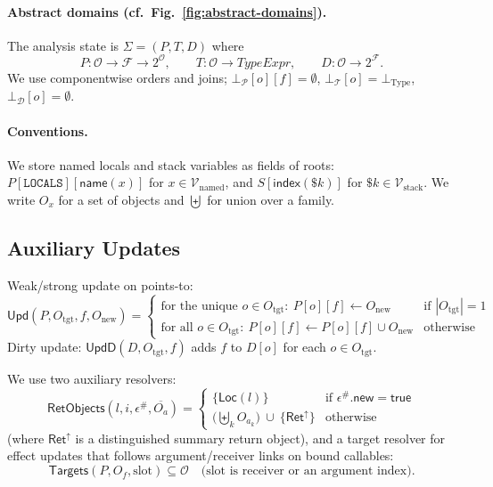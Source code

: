 \paragraph{Abstract domains (cf.\ Fig.~\ref{fig:abstract-domains}).}
The analysis state is \(\Sigma=(P,T,D)\) where
\[
P:\mathcal{O}\to\mathcal{F}\to 2^{\mathcal{O}},\qquad
T:\mathcal{O}\to \mathit{TypeExpr},\qquad
D:\mathcal{O}\to 2^{\mathcal{F}}.
\]
We use componentwise orders and joins; \(\bot_{\mathcal{P}}[o][f]=\emptyset\),
\(\bot_{\mathcal{T}}[o]=\bot_{\mathrm{Type}}\), \(\bot_{\mathcal{D}}[o]=\emptyset\).

\paragraph{Conventions.}
We store named locals and stack variables as fields of roots:
\(P[\mathtt{LOCALS}][\mathsf{name}(x)]\) for \(x\in\mathcal{V}_{\mathrm{named}}\),
and \(S[\mathsf{index}(\$k)]\) for \(\$k\in\mathcal{V}_{\mathrm{stack}}\).
We write \(O_x\) for a set of objects and \(\biguplus\) for union over a family.

\subsection{Auxiliary Updates}

Weak/strong update on points-to:
\[
\mathsf{Upd}(P,O_{\mathrm{tgt}},f,O_{\mathrm{new}})=
\begin{cases}
\text{for the unique }o\in O_{\mathrm{tgt}}:~P[o][f]\leftarrow O_{\mathrm{new}} & \text{if }|O_{\mathrm{tgt}}|=1\\
\text{for all }o\in O_{\mathrm{tgt}}:~P[o][f]\leftarrow P[o][f]\cup O_{\mathrm{new}} & \text{otherwise}
\end{cases}
\]
Dirty update: \(\mathsf{UpdD}(D,O_{\mathrm{tgt}},f)\) adds \(f\) to \(D[o]\) for each \(o\in O_{\mathrm{tgt}}\).

\smallskip
We use two auxiliary resolvers:
\[
\mathsf{RetObjects}(l,i,\epsilon^\#,\overline{O_a}) =
\begin{cases}
\{\mathsf{Loc}(l)\} & \text{if }\epsilon^\#.\mathsf{new}=\mathsf{true}\\
\Big(\biguplus_k O_{a_k}\Big)\ \cup\ \{\mathsf{Ret}^\uparrow\} & \text{otherwise}
\end{cases}
\]
(where \(\mathsf{Ret}^\uparrow\) is a distinguished summary return object),
and a target resolver for effect updates that follows argument/receiver links on bound callables:
\[
\mathsf{Targets}(P, O_f, \text{slot}) \subseteq \mathcal{O}
\quad\text{(slot is receiver or an argument index)}.
\]

